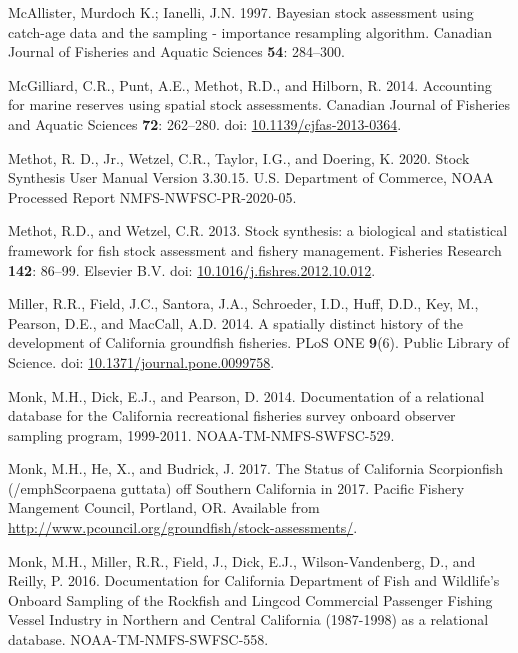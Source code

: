 \documentclass[11pt,
  english,
]{article}
\newlength{\cslhangindent}
\newenvironment{CSLReferences}[2] %
 {%
  \setlength{\parindent}{0pt}
  \ifodd #1 \everypar{\setlength{\hangindent}{\cslhangindent}}\ignorespaces\fi
  \ifnum #2 > 0
  \setlength{\parskip}{#2\baselineskip}
  \fi
 }%
 {}
\begin{document}
\begin{CSLReferences}{1}{0}
\leavevmode{}%
McAllister, Murdoch K.; Ianelli, J.N. 1997. {Bayesian stock assessment using catch-age data and the sampling - importance resampling algorithm}. Canadian Journal of Fisheries and Aquatic Sciences \textbf{54}: 284--300.

\leavevmode{}%
McGilliard, C.R., Punt, A.E., Methot, R.D., and Hilborn, R. 2014. {Accounting for marine reserves using spatial stock assessments}. Canadian Journal of Fisheries and Aquatic Sciences \textbf{72}: 262--280. doi: \href{https://doi.org/10.1139/cjfas-2013-0364}{10.1139/cjfas-2013-0364}.

\leavevmode{}%
Methot, R. D., Jr., Wetzel, C.R., Taylor, I.G., and Doering, K. 2020. {Stock Synthesis User Manual Version 3.30.15}. U.S. Department of Commerce, NOAA Processed Report NMFS-NWFSC-PR-2020-05.

\leavevmode{}%
Methot, R.D., and Wetzel, C.R. 2013. {Stock synthesis: a biological and statistical framework for fish stock assessment and fishery management}. Fisheries Research \textbf{142}: 86--99. Elsevier B.V. doi: \href{https://doi.org/10.1016/j.fishres.2012.10.012}{10.1016/j.fishres.2012.10.012}.

\leavevmode{}%
Miller, R.R., Field, J.C., Santora, J.A., Schroeder, I.D., Huff, D.D., Key, M., Pearson, D.E., and MacCall, A.D. 2014. {A spatially distinct history of the development of California groundfish fisheries}. PLoS ONE \textbf{9}(6). Public Library of Science. doi: \href{https://doi.org/10.1371/journal.pone.0099758}{10.1371/journal.pone.0099758}.

\leavevmode{}%
Monk, M.H., Dick, E.J., and Pearson, D. 2014. {Documentation of a relational database for the California recreational fisheries survey onboard observer sampling program, 1999-2011}. NOAA-TM-NMFS-SWFSC-529.

\leavevmode{}%
Monk, M.H., He, X., and Budrick, J. 2017. {The Status of California Scorpionfish (/emph{Scorpaena guttata}) off Southern California in 2017}. Pacific Fishery Mangement Council, Portland, OR. Available from \url{http://www.pcouncil.org/groundfish/stock-assessments/}.

\leavevmode{}%
Monk, M.H., Miller, R.R., Field, J., Dick, E.J., Wilson-Vandenberg, D., and Reilly, P. 2016. {Documentation for California Department of Fish and Wildlife's Onboard Sampling of the Rockfish and Lingcod Commercial Passenger Fishing Vessel Industry in Northern and Central California (1987-1998) as a relational database}. NOAA-TM-NMFS-SWFSC-558.


\end{CSLReferences}
\end{document}
